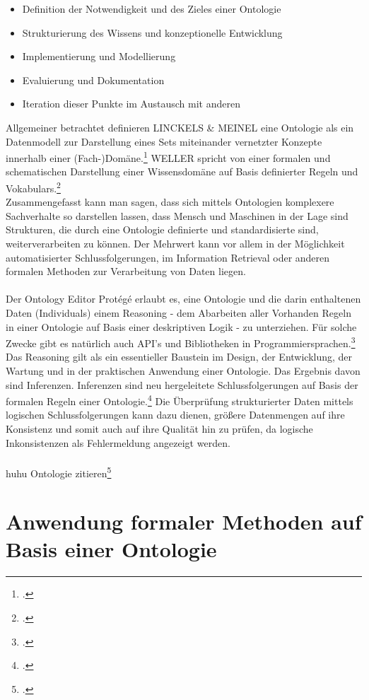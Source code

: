 \documentclass[12pt,a4paper]{article}
\begin{document}
\begin{itemize}
\item Definition der Notwendigkeit und des Zieles einer Ontologie
\item Strukturierung des Wissens und konzeptionelle Entwicklung
\item Implementierung und Modellierung
\item Evaluierung und Dokumentation
\item Iteration dieser Punkte im Austausch mit anderen
\end{itemize}
Allgemeiner betrachtet definieren LINCKELS \& MEINEL eine Ontologie als ein Datenmodell zur Darstellung eines Sets miteinander vernetzter Konzepte innerhalb einer (Fach-)Domäne.\footcite{linckels2011librarian}
WELLER spricht von einer formalen und schematischen Darstellung einer Wissensdomäne auf Basis definierter Regeln und Vokabulars.\footcite{weller2013InformationBand}
\\ 
Zusammengefasst kann man sagen, dass sich mittels Ontologien komplexere Sachverhalte so darstellen lassen, dass Mensch und Maschinen in der Lage sind Strukturen, die durch eine Ontologie definierte und standardisierte sind, weiterverarbeiten zu können. Der Mehrwert kann vor allem in der Möglichkeit automatisierter Schlussfolgerungen, im Information Retrieval oder anderen formalen Methoden zur Verarbeitung von Daten liegen.
\\
\\
Der Ontology Editor Protégé erlaubt es, eine Ontologie und die darin enthaltenen Daten (Individuals) einem Reasoning - dem Abarbeiten aller Vorhanden Regeln in einer Ontologie auf Basis einer deskriptiven Logik - zu unterziehen. Für solche Zwecke gibt es natürlich auch API's und Bibliotheken in Programmiersprachen.\footcite{musen2015protege} Das Reasoning gilt als ein essentieller Baustein im Design, der Entwicklung, der Wartung und in der praktischen Anwendung einer Ontologie. Das Ergebnis davon sind Inferenzen. Inferenzen sind neu hergeleitete Schlussfolgerungen auf Basis der formalen Regeln einer Ontologie.\footcite{dentler2011comparison} Die Überprüfung strukturierter Daten mittels logischen Schlussfolgerungen kann dazu dienen, größere Datenmengen auf ihre Konsistenz und somit auch auf ihre Qualität hin zu prüfen, da logische Inkonsistenzen als Fehlermeldung angezeigt werden.
\\
\\
huhu Ontologie zitieren\footcite[Vgl][S.162-178]{jannidis2017digital} 


\section{Anwendung formaler Methoden auf Basis einer Ontologie}
\label{Umsetzung}
\end{document}
